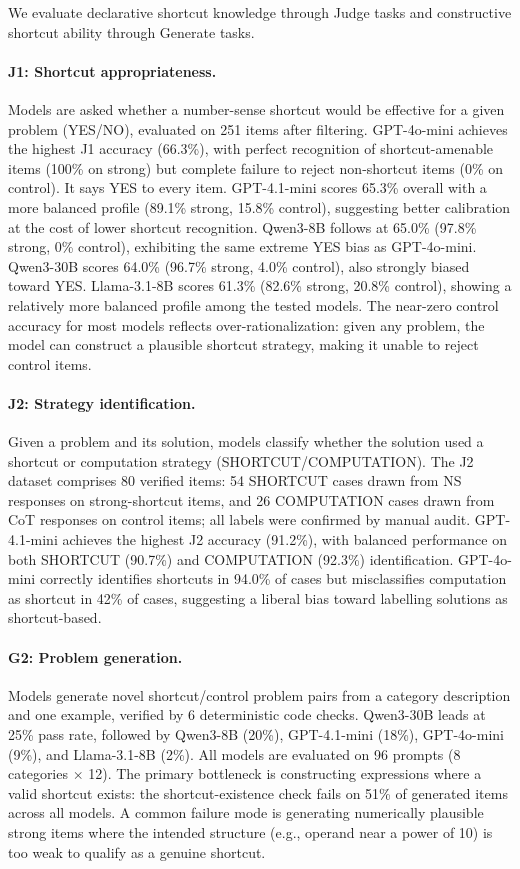 We evaluate declarative shortcut knowledge through Judge tasks and constructive shortcut ability through Generate tasks.

\paragraph{J1: Shortcut appropriateness.}
Models are asked whether a number-sense shortcut would be effective for a given problem (YES/NO), evaluated on 251 items after filtering.
GPT-4o-mini achieves the highest J1 accuracy (66.3\%), with perfect recognition of shortcut-amenable items (100\% on strong) but complete failure to reject non-shortcut items (0\% on control). It says YES to every item.
GPT-4.1-mini scores 65.3\% overall with a more balanced profile (89.1\% strong, 15.8\% control), suggesting better calibration at the cost of lower shortcut recognition.
Qwen3-8B follows at 65.0\% (97.8\% strong, 0\% control), exhibiting the same extreme YES bias as GPT-4o-mini.
Qwen3-30B scores 64.0\% (96.7\% strong, 4.0\% control), also strongly biased toward YES.
Llama-3.1-8B scores 61.3\% (82.6\% strong, 20.8\% control), showing a relatively more balanced profile among the tested models.
The near-zero control accuracy for most models reflects over-rationalization: given any problem, the model can construct a plausible shortcut strategy, making it unable to reject control items.

\paragraph{J2: Strategy identification.}
Given a problem and its solution, models classify whether the solution used a shortcut or computation strategy (SHORTCUT/COMPUTATION).
The J2 dataset comprises 80 verified items: 54 SHORTCUT cases drawn from NS responses on strong-shortcut items, and 26 COMPUTATION cases drawn from CoT responses on control items; all labels were confirmed by manual audit.
GPT-4.1-mini achieves the highest J2 accuracy (91.2\%), with balanced performance on both SHORTCUT (90.7\%) and COMPUTATION (92.3\%) identification.
GPT-4o-mini correctly identifies shortcuts in 94.0\% of cases but misclassifies computation as shortcut in 42\% of cases, suggesting a liberal bias toward labelling solutions as shortcut-based.

\paragraph{G2: Problem generation.}
Models generate novel shortcut/control problem pairs from a category description and one example, verified by 6 deterministic code checks.
Qwen3-30B leads at 25\% pass rate, followed by Qwen3-8B (20\%), GPT-4.1-mini (18\%), GPT-4o-mini (9\%), and Llama-3.1-8B (2\%). All models are evaluated on 96 prompts (8 categories $\times$ 12).
The primary bottleneck is constructing expressions where a valid shortcut exists: the shortcut-existence check fails on 51\% of generated items across all models.
A common failure mode is generating numerically plausible strong items where the intended structure (e.g., operand near a power of 10) is too weak to qualify as a genuine shortcut.

